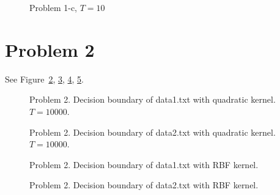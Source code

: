 \documentclass[a4paper,11pt]{article}
\theoremstyle{mytheor}
\begin{document}
\begin{figure}[b]
	\caption{Problem 1-c, $T = 10$}
	\label{fig:1c}
\end{figure}

\section*{Problem 2}
See Figure~\ref{fig:2a-2}, \ref{fig:2a-3}, \ref{fig:2a-4}, \ref{fig:2a-5}.

\begin{figure}[b]
	\caption{Problem 2. Decision boundary of data1.txt with quadratic kernel. $T = 10000$.}
	\label{fig:2a-2}
\end{figure}

\begin{figure}[b]
	\caption{Problem 2. Decision boundary of data2.txt with quadratic kernel. $T = 10000$.}
	\label{fig:2a-3}
\end{figure}

\begin{figure}[b]
	\caption{Problem 2. Decision boundary of data1.txt with RBF kernel.}
	\label{fig:2a-4}
\end{figure}


\begin{figure}[b]
	\caption{Problem 2. Decision boundary of data2.txt with RBF kernel.}
	\label{fig:2a-5}
\end{figure}
\end{document}

